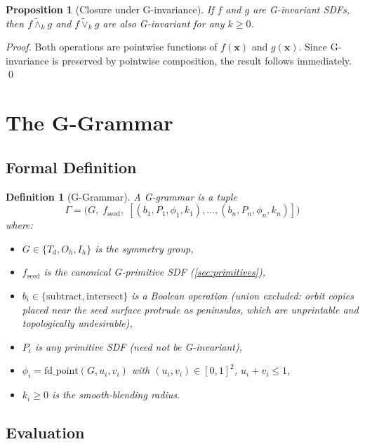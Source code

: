 \documentclass[11pt, a4paper]{article}
\newtheorem{definition}{Definition}[section]
\newtheorem{proposition}{Proposition}[section]
\newcommand{\smin}{\mathbin{\tilde{\wedge}}}
\newcommand{\smax}{\mathbin{\tilde{\vee}}}
\newcommand{\Td}{T_d}
\newcommand{\Oh}{O_h}
\newcommand{\Ih}{I_h}
\begin{document}
\begin{proposition}[Closure under G-invariance]
If $f$ and $g$ are G-invariant SDFs, then $f \smin_k g$ and $f \smax_k g$
are also G-invariant for any $k \geq 0$.
\end{proposition}
\begin{proof}
Both operations are pointwise functions of $f(\mathbf{x})$ and $g(\mathbf{x})$.
Since G-invariance is preserved by pointwise composition, the result follows
immediately. \qed
\end{proof}

\section{The G-Grammar}
\label{sec:grammar}

\subsection{Formal Definition}

\begin{definition}[G-Grammar]
A \emph{G-grammar} is a tuple
\[
  \Gamma = \bigl(G,\; f_{\mathrm{seed}},\; [(b_1, P_1, \phi_1, k_1), \ldots, (b_n, P_n, \phi_n, k_n)]\bigr)
\]
where:
\begin{itemize}
  \item $G \in \{\Td, \Oh, \Ih\}$ is the symmetry group,
  \item $f_{\mathrm{seed}}$ is the canonical G-primitive SDF (\cref{sec:primitives}),
  \item $b_i \in \{\mathrm{subtract}, \mathrm{intersect}\}$ is a Boolean operation
        (union excluded: orbit copies placed near the seed surface protrude as
        peninsulas, which are unprintable and topologically undesirable),
  \item $P_i$ is any primitive SDF (need not be G-invariant),
  \item $\phi_i = \mathrm{fd\_point}(G, u_i, v_i)$ with $(u_i, v_i) \in [0,1]^2$, $u_i+v_i\leq 1$,
  \item $k_i \geq 0$ is the smooth-blending radius.
\end{itemize}
\end{definition}

\subsection{Evaluation}
\end{document}
